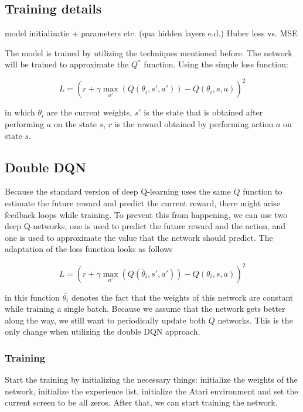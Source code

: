 \documentclass{article}
\begin{document}
\subsection{Training details} \label{chapter:training}
model initializatie + parameters etc. (qua hidden layers e.d.)
Huber loss vs. MSE

The model is trained by utilizing the techniques mentioned before. The network will be trained to approximate the $Q^*$ function. Using the simple loss function:

\[
	L = \left(r + \gamma \max_{a'}( Q(\theta_i, s',a')) - Q(\theta_i, s, a)\right)^2
\]

in which $\theta_i$ are the current weights, $s'$ is the state that is obtained after performing $a$ on the state $s$, $r$ is the reward obtained by performing action $a$ on state $s$.

\subsection{Double DQN}

Because the standard version of deep Q-learning uses the same $Q$ function to estimate the future reward and predict the current reward, there might arise feedback loops while training. To prevent this from happening, we can use two deep Q-networks, one is used to predict the future reward and the action, and one is used to approximate the value that the network should predict. The adaptation of the loss function looks as follows

\[
	L = \left(r + \gamma \max_{a'}( Q(\bar\theta_i, s',a')) - Q(\theta_i, s, a)\right)^2
\]

in this function $\bar{\theta_i}
$ denotes the fact that the weights of this network are constant while training a single batch. 
Because we assume that the network gets better along the way, we still want to periodically update both $Q$ networks. This is the only change when utilizing the double DQN approach.


\subsubsection{Training}
Start the training by initializing the necessary things: initialize the weights of the network, initialize the experience list, initialize the Atari environment and set the current screen to be all zeros. After that, we can start training the network. 
\end{document}
